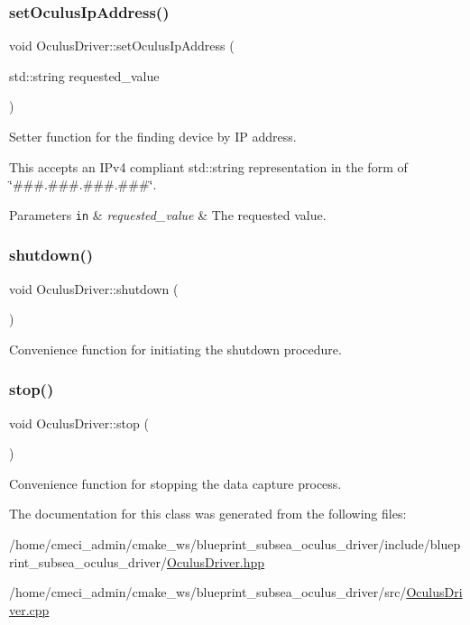 \subsubsection{\texorpdfstring{set\+Oculus\+Ip\+Address()}{setOculusIpAddress()}}
{\footnotesize\ttfamily void Oculus\+Driver\+::set\+Oculus\+Ip\+Address (\begin{DoxyParamCaption}\item[{std\+::string}]{requested\+\_\+value }\end{DoxyParamCaption})}

Setter function for the finding device by IP address.

This accepts an I\+Pv4 compliant std\+::string representation in the form of \char`\"{}\#\#\#.\#\#\#.\#\#\#.\#\#\#\char`\"{}.


\begin{DoxyParams}[1]{Parameters}
\mbox{\tt in}  & {\em requested\+\_\+value} & The requested value. \\
\hline
\end{DoxyParams}
\mbox{\label{classOculusDriver_a4687f949c3547241c317504856b76201}} 
\subsubsection{\texorpdfstring{shutdown()}{shutdown()}}
{\footnotesize\ttfamily void Oculus\+Driver\+::shutdown (\begin{DoxyParamCaption}{ }\end{DoxyParamCaption})}

Convenience function for initiating the shutdown procedure. \mbox{\label{classOculusDriver_a76f26d85e497e941a59b6f5d6bca957f}} 
\subsubsection{\texorpdfstring{stop()}{stop()}}
{\footnotesize\ttfamily void Oculus\+Driver\+::stop (\begin{DoxyParamCaption}{ }\end{DoxyParamCaption})}

Convenience function for stopping the data capture process. 

The documentation for this class was generated from the following files\+:\begin{DoxyCompactItemize}
\item 
/home/cmeci\+\_\+admin/cmake\+\_\+ws/blueprint\+\_\+subsea\+\_\+oculus\+\_\+driver/include/blueprint\+\_\+subsea\+\_\+oculus\+\_\+driver/\hyperlink{OculusDriver_8hpp}{Oculus\+Driver.\+hpp}\item 
/home/cmeci\+\_\+admin/cmake\+\_\+ws/blueprint\+\_\+subsea\+\_\+oculus\+\_\+driver/src/\hyperlink{OculusDriver_8cpp}{Oculus\+Driver.\+cpp}\end{DoxyCompactItemize}
